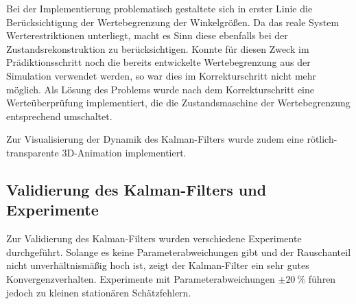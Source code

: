 \documentclass[10pt,twocolumn]{article}
\begin{document}
	Bei der Implementierung problematisch gestaltete sich in erster Linie die Berücksichtigung der Wertebegrenzung der Winkelgrößen.
	Da das reale System Werterestriktionen unterliegt, macht es Sinn diese ebenfalls bei der Zustandsrekonstruktion zu berücksichtigen.
	Konnte für diesen Zweck im Prädiktionsschritt noch die bereits entwickelte Wertebegrenzung aus der Simulation verwendet werden, so war dies im Korrekturschritt nicht mehr möglich.
	Als Lösung des Problems wurde nach dem Korrekturschritt eine Werteüberprüfung implementiert, die die Zustandsmaschine der Wertebegrenzung entsprechend umschaltet.

	Zur Visualisierung der Dynamik des Kalman-Filters wurde zudem eine rötlich-transparente 3D-Animation implementiert.
	
	\subsection{Validierung des Kalman-Filters und Experimente}
	Zur Validierung des Kalman-Filters wurden verschiedene Experimente durchgeführt.
	Solange es keine Parameterabweichungen gibt und der Rauschanteil nicht unverhältnismäßig hoch ist, zeigt der Kalman-Filter ein sehr gutes Konvergenzverhalten.
	Experimente mit Parameterabweichungen $\pm \SI{20}{\percent}$ führen jedoch zu kleinen stationären Schätzfehlern.
	

\nocite{ex3}
\end{document}
